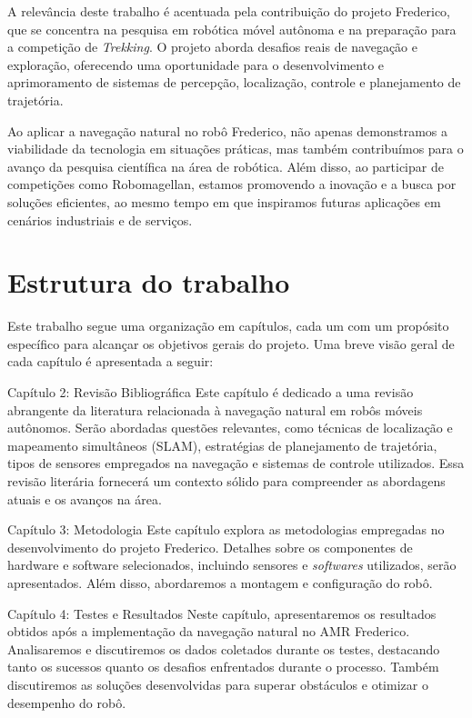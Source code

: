 A relevância deste trabalho é acentuada pela contribuição do projeto Frederico, que se concentra na pesquisa em robótica móvel autônoma e na preparação para a competição de \textit{Trekking}. O projeto aborda desafios reais de navegação e exploração, oferecendo uma oportunidade para o desenvolvimento e aprimoramento de sistemas de percepção, localização, controle e planejamento de trajetória.

Ao aplicar a navegação natural no robô Frederico, não apenas demonstramos a viabilidade da tecnologia em situações práticas, mas também contribuímos para o avanço da pesquisa científica na área de robótica. Além disso, ao participar de competições como Robomagellan, estamos promovendo a inovação e a busca por soluções eficientes, ao mesmo tempo em que inspiramos futuras aplicações em cenários industriais e de serviços.

\section{\textbf{Estrutura do trabalho}}

Este trabalho segue uma organização em capítulos, cada um com um propósito específico para alcançar os objetivos gerais do projeto. Uma breve visão geral de cada capítulo é apresentada a seguir:

Capítulo 2: Revisão Bibliográfica
Este capítulo é dedicado a uma revisão abrangente da literatura relacionada à navegação natural em robôs móveis autônomos. Serão abordadas questões relevantes, como técnicas de localização e mapeamento simultâneos (SLAM), estratégias de planejamento de trajetória, tipos de sensores empregados na navegação e sistemas de controle utilizados. Essa revisão literária fornecerá um contexto sólido para compreender as abordagens atuais e os avanços na área.

Capítulo 3: Metodologia
Este capítulo explora as metodologias empregadas no desenvolvimento do projeto Frederico. Detalhes sobre os componentes de hardware e software selecionados, incluindo sensores e \textit{softwares} utilizados, serão apresentados. Além disso, abordaremos a montagem e configuração do robô. 

Capítulo 4: Testes e Resultados
Neste capítulo, apresentaremos os resultados obtidos após a implementação da navegação natural no AMR Frederico. Analisaremos e discutiremos os dados coletados durante os testes, destacando tanto os sucessos quanto os desafios enfrentados durante o processo. Também discutiremos as soluções desenvolvidas para superar obstáculos e otimizar o desempenho do robô.


